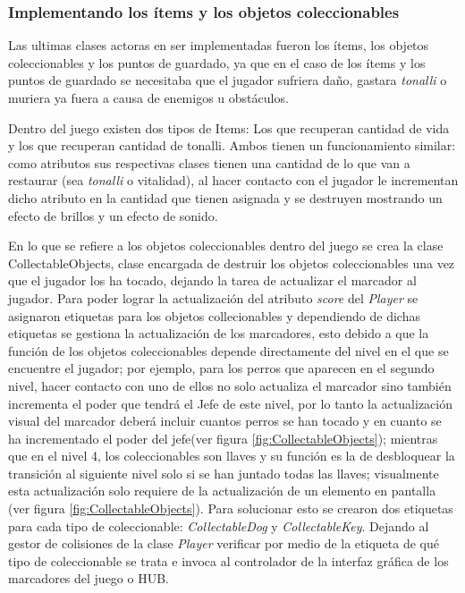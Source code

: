 \subsubsection{Implementando los ítems y los objetos coleccionables}
Las ultimas clases actoras en ser implementadas fueron los ítems, los objetos 
coleccionables y los puntos de guardado, ya que en el caso de los ítems y los 
puntos de guardado se necesitaba que el jugador sufriera daño, gastara 
\textit{tonalli} o muriera ya fuera a causa de enemigos u obstáculos. 
\\
\par
Dentro del juego existen dos tipos de Items: Los que recuperan cantidad de vida y 
los que recuperan cantidad de tonalli. Ambos tienen un funcionamiento similar: como 
atributos sus respectivas clases tienen una cantidad de lo que van a restaurar 
(sea \textit{tonalli} o vitalidad), al hacer contacto con el jugador le incrementan 
dicho atributo en la cantidad que tienen asignada y se destruyen mostrando un 
efecto de brillos y un efecto de sonido. 
\\
\par
En lo que se refiere a los objetos coleccionables dentro del juego se crea la 
clase CollectableObjects, clase encargada de destruir los objetos coleccionables 
una vez que el jugador los ha tocado, dejando la tarea de actualizar el marcador 
al jugador. Para poder lograr la actualización del atributo \textit{score} del 
\textit{Player} se asignaron etiquetas para los objetos collecionables y dependiendo 
de dichas etiquetas se gestiona la actualización de los marcadores, esto debido a que 
la función de los objetos coleccionables depende directamente del nivel en el que 
se encuentre el jugador; por ejemplo, para los perros que aparecen en el segundo 
nivel, hacer contacto con uno de ellos no solo actualiza el marcador sino también 
incrementa el poder que tendrá el Jefe de este nivel, por lo tanto 
la actualización visual del marcador deberá incluir cuantos perros se han tocado 
y en cuanto se ha incrementado el poder del jefe(ver figura 
\ref{fig:CollectableObjects}); mientras que en el nivel 4, los coleccionables 
son llaves y su función es la de desbloquear la transición al siguiente nivel 
solo si se han juntado todas las llaves; visualmente esta actualización solo 
requiere de la actualización de un elemento en pantalla (ver figura \ref{fig:CollectableObjects}). Para solucionar esto se crearon dos etiquetas para cada tipo de coleccionable: \textit{CollectableDog} y \textit{CollectableKey}.  Dejando al gestor de colisiones de la clase \textit{Player} verificar por medio de la etiqueta de qué tipo de coleccionable se trata e invoca al controlador de la interfaz gráfica de los marcadores del juego o HUB.
			
